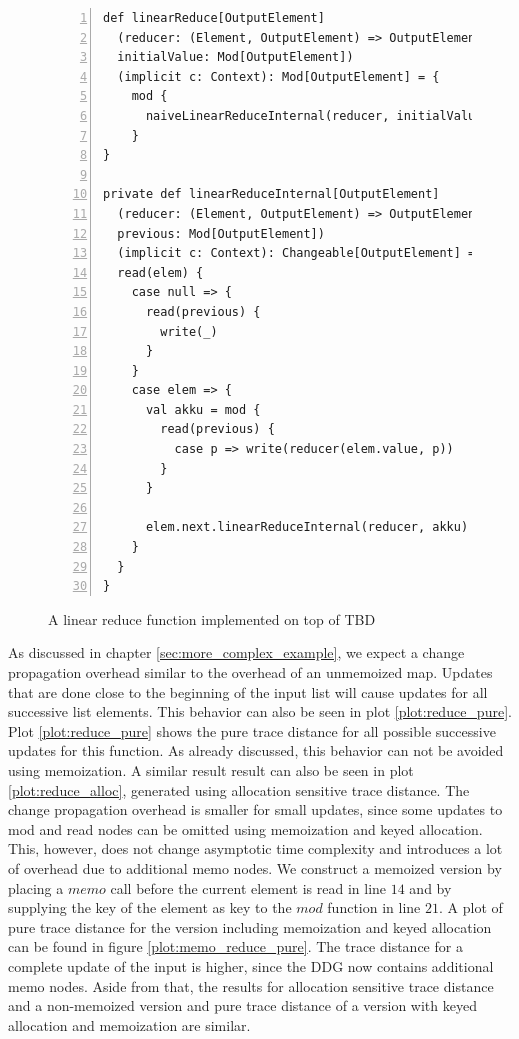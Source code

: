 \begin{figure}
\begin{lstlisting}[frame=single,basicstyle=\ttfamily,numbers=left,mathescape=true]
def linearReduce[OutputElement]
  (reducer: (Element, OutputElement) => OutputElement, 
  initialValue: Mod[OutputElement])
  (implicit c: Context): Mod[OutputElement] = {
    mod {
      naiveLinearReduceInternal(reducer, initialValue)
    }
}

private def linearReduceInternal[OutputElement]
  (reducer: (Element, OutputElement) => OutputElement, 
  previous: Mod[OutputElement])
  (implicit c: Context): Changeable[OutputElement] = {
  read(elem) {
    case null => {
      read(previous) {
        write(_)
      }
    }
    case elem => {
      val akku = mod {
        read(previous) {
          case p => write(reducer(elem.value, p))
        }
      }

      elem.next.linearReduceInternal(reducer, akku)
    }
  }
}
\end{lstlisting}
\caption{A linear reduce function implemented on top of TBD}
\label{code:linear_reduce}
\end{figure}

As discussed in chapter \ref{sec:more_complex_example}, we expect a change propagation overhead similar to the overhead of an unmemoized map. Updates that are done close to the beginning of the input list will cause updates for all successive list elements. This behavior can also be seen in plot \ref{plot:reduce_pure}. Plot \ref{plot:reduce_pure} shows the pure trace distance for all possible successive updates for this function. As already discussed, this behavior can not be avoided using memoization. A similar result result can also be seen in plot \ref{plot:reduce_alloc}, generated using allocation sensitive trace distance. The change propagation overhead is smaller for small updates, since some updates to mod and read nodes can be omitted using memoization and keyed allocation. This, however, does not change asymptotic time complexity and introduces a lot of overhead due to additional memo nodes. We construct a memoized version by placing a $memo$ call before the current element is read in line $14$ and by supplying the key of the element as key to the $mod$ function in line $21$. A plot of pure trace distance for the version including memoization and keyed allocation can be found in figure \ref{plot:memo_reduce_pure}. The trace distance for a complete update of the input is higher, since the DDG now contains additional memo nodes. Aside from that, the results for allocation sensitive trace distance and a non-memoized version and pure trace distance of a version with keyed allocation and memoization are similar. 

